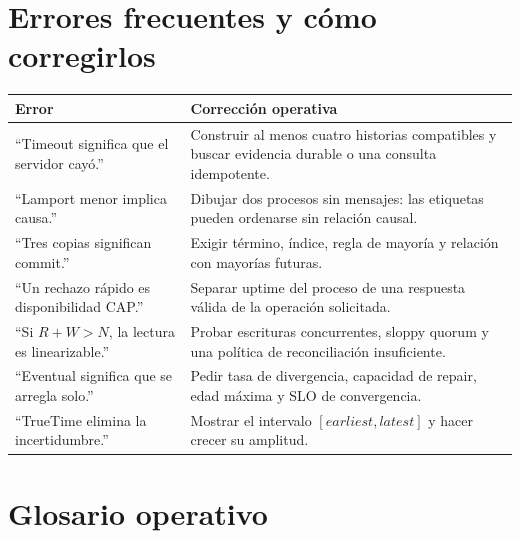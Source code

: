 \documentclass[variant=apuntes,cover=institutional,mode=screen]{ua-engineering-v6-article}
\begin{document}
\section{Errores frecuentes y cómo corregirlos}

\begin{longtable}{p{}p{}}
\toprule
\textbf{Error} & \textbf{Corrección operativa}\\
\midrule
``Timeout significa que el servidor cayó.'' & Construir al menos cuatro historias compatibles y buscar evidencia durable o una consulta idempotente.\\
``Lamport menor implica causa.'' & Dibujar dos procesos sin mensajes: las etiquetas pueden ordenarse sin relación causal.\\
``Tres copias significan commit.'' & Exigir término, índice, regla de mayoría y relación con mayorías futuras.\\
``Un rechazo rápido es disponibilidad CAP.'' & Separar uptime del proceso de una respuesta válida de la operación solicitada.\\
``Si $R+W>N$, la lectura es linearizable.'' & Probar escrituras concurrentes, sloppy quorum y una política de reconciliación insuficiente.\\
``Eventual significa que se arregla solo.'' & Pedir tasa de divergencia, capacidad de repair, edad máxima y SLO de convergencia.\\
``TrueTime elimina la incertidumbre.'' & Mostrar el intervalo $[earliest,latest]$ y hacer crecer su amplitud.\\
\bottomrule
\end{longtable}

\section{Glosario operativo}
\end{document}
